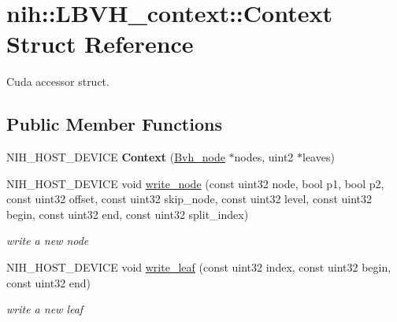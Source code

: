 \hypertarget{structnih_1_1_l_b_v_h__context_1_1_context}{
\section{nih\-:\-:\-L\-B\-V\-H\-\_\-context\-:\-:\-Context \-Struct \-Reference}
\label{structnih_1_1_l_b_v_h__context_1_1_context}
}


\-Cuda accessor struct.  


\subsection*{\-Public \-Member \-Functions}
\begin{DoxyCompactItemize}
\item 
\hypertarget{structnih_1_1_l_b_v_h__context_1_1_context_a7db539520707a6af78a676aec5a4a5bd}{
\-N\-I\-H\-\_\-\-H\-O\-S\-T\-\_\-\-D\-E\-V\-I\-C\-E {\bfseries \-Context} (\hyperlink{structnih_1_1_bvh__node}{\-Bvh\-\_\-node} $\ast$nodes, uint2 $\ast$leaves)}
\label{structnih_1_1_l_b_v_h__context_1_1_context_a7db539520707a6af78a676aec5a4a5bd}

\item 
\hypertarget{structnih_1_1_l_b_v_h__context_1_1_context_a6d15cc4d99d100717b46e1d5e328c466}{
\-N\-I\-H\-\_\-\-H\-O\-S\-T\-\_\-\-D\-E\-V\-I\-C\-E void \hyperlink{structnih_1_1_l_b_v_h__context_1_1_context_a6d15cc4d99d100717b46e1d5e328c466}{write\-\_\-node} (const uint32 node, bool p1, bool p2, const uint32 offset, const uint32 skip\-\_\-node, const uint32 level, const uint32 begin, const uint32 end, const uint32 split\-\_\-index)}
\label{structnih_1_1_l_b_v_h__context_1_1_context_a6d15cc4d99d100717b46e1d5e328c466}

\begin{DoxyCompactList}\small\item\em write a new node \end{DoxyCompactList}\item 
\hypertarget{structnih_1_1_l_b_v_h__context_1_1_context_ac6d102b14fa92503b65859a096a48628}{
\-N\-I\-H\-\_\-\-H\-O\-S\-T\-\_\-\-D\-E\-V\-I\-C\-E void \hyperlink{structnih_1_1_l_b_v_h__context_1_1_context_ac6d102b14fa92503b65859a096a48628}{write\-\_\-leaf} (const uint32 index, const uint32 begin, const uint32 end)}
\label{structnih_1_1_l_b_v_h__context_1_1_context_ac6d102b14fa92503b65859a096a48628}

\begin{DoxyCompactList}\small\item\em write a new leaf \end{DoxyCompactList}\end{DoxyCompactItemize}
